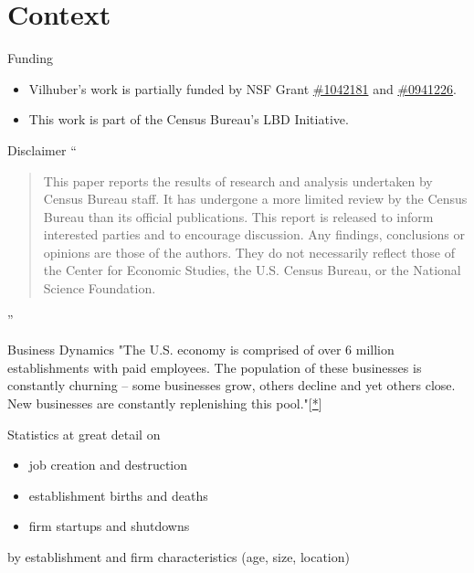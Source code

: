 \section{Context}
\begin{frame}
\begin{block}{Funding}
\begin{itemize}
\item Vilhuber's work is partially funded by NSF Grant 
\href{http://www.nsf.gov/awardsearch/showAward.do?AwardNumber=1042181}{\#1042181} 
and 
\href{http://www.nsf.gov/awardsearch/showAward.do?AwardNumber=0941226}{\#0941226}. 
\item This work is part of the Census Bureau's LBD Initiative.
\end{itemize}
\end{block}
\begin{block}{Disclaimer}
\huge ``
\begin{quote}
\footnotesize This paper reports the results of research and analysis 
undertaken by Census Bureau staff. It has undergone a more limited review by the Census Bureau than its 
official publications. This report is released to inform interested parties and to encourage discussion. Any 
findings, conclusions or opinions are those of the authors. They do not necessarily reflect those of the Center for 
Economic Studies, the U.S. Census Bureau, or the National Science Foundation. 
\end{quote}
\flushright ''
\end{block}
\end{frame}


\begin{frame}
\begin{block}{Business Dynamics}
"The U.S. economy is comprised of over 6 million establishments with paid employees. The population of these businesses is constantly churning -- some businesses grow, others decline and yet others close. New businesses are constantly replenishing this pool."[\href{https://www.census.gov/ces/dataproducts/bds/overview.html}{*}]
\end{block}
\begin{block}{Statistics at great detail on }
\begin{itemize}
\item job creation and destruction
\item establishment births and deaths
\item firm startups and shutdowns
\end{itemize}
by establishment and firm characteristics (age, size, location)
\end{block}
\end{frame}

